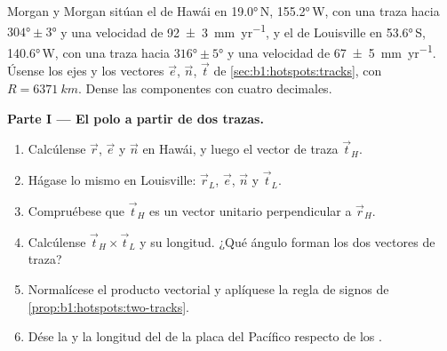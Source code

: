 \begin{problem}
\label{pb:b1:hotspots:1}
Morgan y Morgan sitúan el  de Hawái en \ang{19.0}\,N, \ang{155.2}\,W, con una traza hacia $\ang{304}\pm\ang{3}$ y una velocidad de
\qty[uncertainty-mode=separate]{92 \pm 3}{mm.yr^{-1}}, y el  de Louisville en \ang{53.6}\,S, \ang{140.6}\,W, con una traza hacia
$\ang{316}\pm\ang{5}$ y una velocidad de \qty[uncertainty-mode=separate]{67 \pm 5}{mm.yr^{-1}}. Úsense los ejes y los vectores $\vec e$, $\vec n$, $\vec t$ de
\cref{sec:b1:hotspots:tracks}, con $R = \qty{6371}{km}$. Dense las componentes con cuatro decimales.

\medskip
\noindent\textbf{Parte I --- El polo a partir de dos trazas.}
\begin{enumerate}
  \item Calcúlense $\vec r$, $\vec e$ y $\vec n$ en Hawái, y luego el vector de traza $\vec t_H$.
  \item Hágase lo mismo en Louisville: $\vec r_L$, $\vec e$, $\vec n$ y $\vec t_L$.
  \item Compruébese que $\vec t_H$ es un vector unitario perpendicular a $\vec r_H$.
  \item Calcúlense $\vec t_H\times\vec t_L$ y su longitud. ¿Qué ángulo forman los dos vectores de traza?
  \item Normalícese el producto vectorial y aplíquese la regla de signos de \cref{prop:b1:hotspots:two-tracks}.
  \item Dése la  y la longitud del  de la placa del Pacífico respecto de los .
\end{enumerate}


\end{problem}
